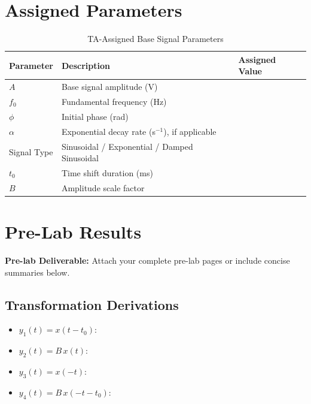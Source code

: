 \documentclass[11pt,letterpaper]{article}
\providecommand{\pldECE}[1]{\textcolor{BrickRed}{\textbf{Pre-lab Deliverable:} #1}}
\begin{document}
\clearpage

\section{Assigned Parameters}
\begin{table}[H]
    \centering
    \caption{TA-Assigned Base Signal Parameters}
    \begin{tabularx}{\linewidth}{l X l}
    \toprule
    \textbf{Parameter} & \textbf{Description} & \textbf{Assigned Value}\\
    \midrule
    $A$ & Base signal amplitude (V) & \underline{\hspace{2.5cm}}\\
    $f_0$ & Fundamental frequency (Hz) & \underline{\hspace{2.5cm}}\\
    $\phi$ & Initial phase (rad) & \underline{\hspace{2.5cm}}\\
    $\alpha$ & Exponential decay rate (s$^{-1}$), if applicable & \underline{\hspace{2.5cm}}\\
    Signal Type & Sinusoidal / Exponential / Damped Sinusoidal & \underline{\hspace{2.5cm}}\\
    $t_0$ & Time shift duration (ms) & \underline{\hspace{2.5cm}}\\
    $B$ & Amplitude scale factor & \underline{\hspace{2.5cm}}\\
    \bottomrule
    \end{tabularx}
\end{table}

\section{Pre-Lab Results}
\pldECE{Attach your complete pre-lab pages or include concise summaries below.}

\subsection{Transformation Derivations}
\begin{itemize}
    \item $y_1(t) = x(t - t_0)$: \underline{\hspace{9cm}}
    \item $y_2(t) = B\,x(t)$: \underline{\hspace{9cm}}
    \item $y_3(t) = x(-t)$: \underline{\hspace{9cm}}
    \item $y_4(t) = B\,x(-t - t_0)$: \underline{\hspace{7.5cm}}
\end{itemize}
\end{document}
